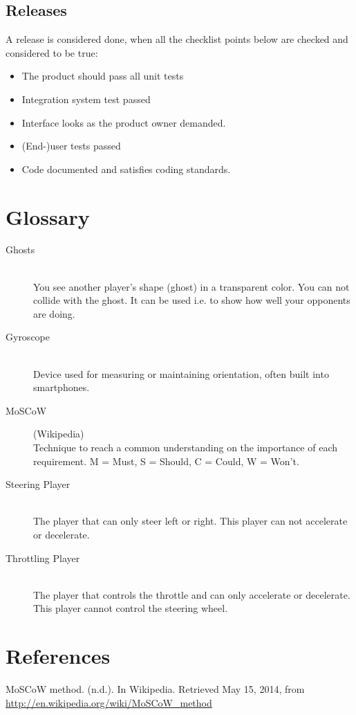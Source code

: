 \documentclass[11pt,twoside,a4paper]{article}
\begin{document}
\subsection{Releases}
A release is considered done, when all the checklist points below are checked and considered to be true:
\begin{itemize}
	\item The product should pass all unit tests
	\item Integration system test passed
	\item Interface looks as the product owner demanded.
	\item (End-)user tests passed
	\item Code documented and satisfies coding standards.
\end{itemize}
\newpage
\section{Glossary}
\begin{description}
\item[Ghosts] \hfill \\
You see another player's shape (ghost) in a transparent color. You can not collide with the ghost. It can be used i.e. to show how well your opponents are doing.
\item[Gyroscope] \hfill \\
Device used for measuring or maintaining orientation, often built into smartphones.
\item[MoSCoW] (Wikipedia) \hfill \\
Technique to reach a common understanding on the importance of each requirement. M = Must, S = Should, C = Could, W = Won't.
\item[Steering Player] \hfill \\
The player that can only steer left or right. This player can not accelerate or decelerate.
\item[Throttling Player] \hfill \\
The player that controls the throttle and can only accelerate or decelerate. This player cannot control the steering wheel.

\end{description}


\section*{References}
MoSCoW method. (n.d.). In Wikipedia. Retrieved May 15, 2014, from \url{http://en.wikipedia.org/wiki/MoSCoW_method}
\end{document}
